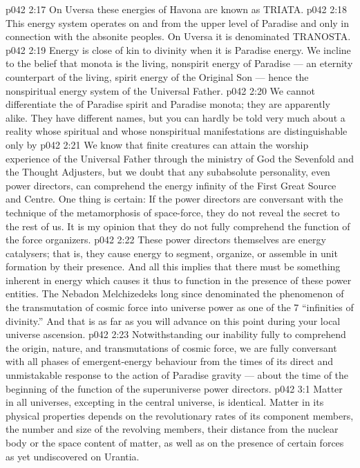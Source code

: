 \vs p042 2:17 On Uversa these energies of Havona are known as TRIATA.
\vs p042 2:18 \bibnobreakspace {} This energy system operates on and from the upper level of Paradise and only in connection with the absonite peoples. On Uversa it is denominated TRANOSTA.
\vs p042 2:19 \bibnobreakspace {} Energy is close of kin to divinity when it is Paradise energy. We incline to the belief that monota is the living, nonspirit energy of Paradise --- an eternity counterpart of the living, spirit energy of the Original Son --- hence the nonspiritual energy system of the Universal Father.
\vs p042 2:20 We cannot differentiate the  of Paradise spirit and Paradise monota; they are apparently alike. They have different names, but you can hardly be told very much about a reality whose spiritual and whose nonspiritual manifestations are distinguishable only by 
\vs p042 2:21 \pc We know that finite creatures can attain the worship experience of the Universal Father through the ministry of God the Sevenfold and the Thought Adjusters, but we doubt that any subabsolute personality, even power directors, can comprehend the energy infinity of the First Great Source and Centre. One thing is certain: If the power directors are conversant with the technique of the metamorphosis of space\hyp{}force, they do not reveal the secret to the rest of us. It is my opinion that they do not fully comprehend the function of the force organizers.
\vs p042 2:22 These power directors themselves are energy catalysers; that is, they cause energy to segment, organize, or assemble in unit formation by their presence. And all this implies that there must be something inherent in energy which causes it thus to function in the presence of these power entities. The Nebadon Melchizedeks long since denominated the phenomenon of the transmutation of cosmic force into universe power as one of the 7 “infinities of divinity.” And that is as far as you will advance on this point during your local universe ascension.
\vs p042 2:23 \pc Notwithstanding our inability fully to comprehend the origin, nature, and transmutations of cosmic force, we are fully conversant with all phases of emergent\hyp{}energy behaviour from the times of its direct and unmistakable response to the action of Paradise gravity --- about the time of the beginning of the function of the superuniverse power directors.
\vs p042 3:1 Matter in all universes, excepting in the central universe, is identical. Matter in its physical properties depends on the revolutionary rates of its component members, the number and size of the revolving members, their distance from the nuclear body or the space content of matter, as well as on the presence of certain forces as yet undiscovered on Urantia.
